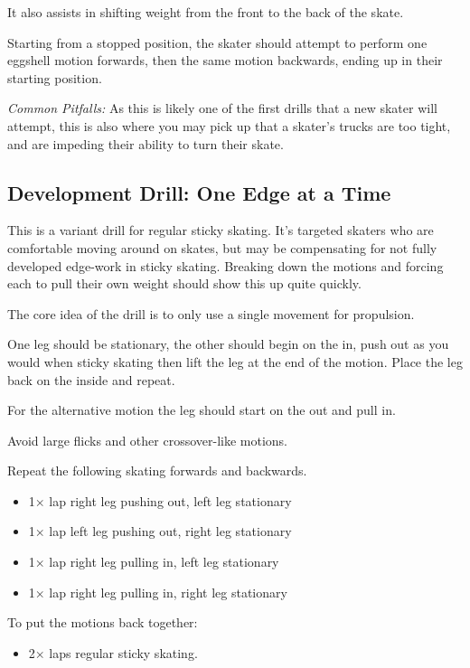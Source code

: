 It also assists in shifting weight from the front to the back of the skate. 

Starting from a stopped position, the skater should attempt to perform one eggshell motion forwards, then the same motion backwards, ending up in their starting position.  


{\it Common Pitfalls:} As this is likely one of the first drills that a new skater will attempt, this is also where you may pick up that a skater's trucks are too tight, and are impeding their ability to turn their skate. 
 
\subsection*{Development Drill: One Edge at a Time}
\label{drill:sticky/eggshells/one_edge}

This is a variant drill for regular sticky skating. 
It's targeted skaters who are comfortable moving around on skates, but may be compensating for not fully developed edge-work in sticky skating.
Breaking down the motions and forcing each to pull their own weight should show this up quite quickly.

The core idea of the drill is to only use a single movement for propulsion.  

One leg should be stationary, the other should begin on the in, push out as you would when sticky skating then lift the leg at the end of the motion.  
Place the leg back on the inside and repeat. 

For the alternative motion the leg should start on the out and pull in.   

Avoid large flicks and other crossover-like motions.    

Repeat the following skating forwards and backwards. 
\begin{itemize}
    \item 1$\times$ lap right leg pushing out, left leg stationary  
    \item 1$\times$ lap left leg pushing out, right leg stationary 
    \item 1$\times$ lap right leg pulling in, left leg stationary 
    \item 1$\times$ lap right leg pulling in, right leg stationary 
\end{itemize}

To put the motions back together:
\begin{itemize}
    \item 2$\times$ laps regular sticky skating. 
\end{itemize}


